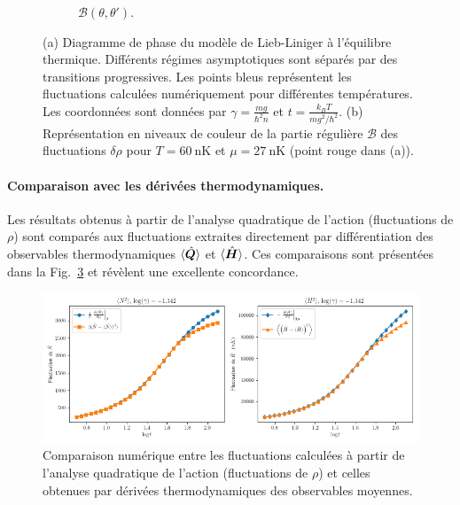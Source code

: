 \begin{figure}[H]
\begin{subfigure}[b]{0.45\textwidth}
		\caption{ \( \mathcal{B}(\theta, \theta') \).}
		\label{fig.fluctu.A}
	\end{subfigure}
	\caption{(a) Diagramme de phase du modèle de Lieb-Liniger à l’équilibre thermique. Différents régimes asymptotiques sont séparés par des transitions progressives. Les points bleus représentent les fluctuations calculées numériquement pour différentes températures. Les coordonnées sont données par \( \gamma = \frac{m g}{\hbar^2 n} \) et \( t = \frac{k_B T}{m g^2/\hbar^2} \). (b) Représentation en niveaux de couleur de la partie régulière $\mathcal{B}$ des fluctuations \( \delta \rho \) pour \( T = 60~\mathrm{nK} \) et \( \mu = 27~\mathrm{nK} \) (point rouge dans (a)).}
	\label{fig:diag_fig}
\end{figure}

\paragraph{Comparaison avec les dérivées thermodynamiques.}

Les résultats obtenus à partir de l’analyse quadratique de l’action (fluctuations de \( \rho \)) sont comparés aux fluctuations extraites directement par différentiation des observables thermodynamiques \( \langle \hat{\bm{Q}} \rangle \) et \( \langle \hat{\bm{H}} \rangle \). Ces comparaisons sont présentées dans la Fig.~\ref{fig.fluctu.A_com} et révèlent une excellente concordance.




\begin{figure}[H]
	\centering 
	\includegraphics[width=1\textwidth]{Figures/fluctuations_plot_log_gamma=-1.342.png}	
	\caption{Comparaison numérique entre les fluctuations calculées à partir de l’analyse quadratique de l’action (fluctuations de \( \rho \)) et celles obtenues par dérivées thermodynamiques des observables moyennes.}
	\label{fig.fluctu.A_com}
\end{figure}



